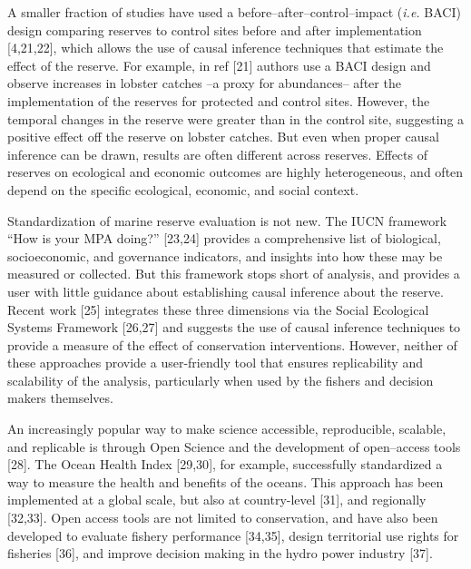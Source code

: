 \documentclass[12pt,]{article}
\begin{document}
A smaller fraction of studies have used a before--after--control--impact
(\emph{i.e.} BACI) design comparing reserves to control sites before and
after implementation {[}4,21,22{]}, which allows the use of causal
inference techniques that estimate the effect of the reserve. For
example, in ref {[}21{]} authors use a BACI design and observe increases
in lobster catches --a proxy for abundances-- after the implementation
of the reserves for protected and control sites. However, the temporal
changes in the reserve were greater than in the control site, suggesting
a positive effect off the reserve on lobster catches. But even when
proper causal inference can be drawn, results are often different across
reserves. Effects of reserves on ecological and economic outcomes are
highly heterogeneous, and often depend on the specific ecological,
economic, and social context.

Standardization of marine reserve evaluation is not new. The IUCN
framework ``How is your MPA doing?'' {[}23,24{]} provides a
comprehensive list of biological, socioeconomic, and governance
indicators, and insights into how these may be measured or collected.
But this framework stops short of analysis, and provides a user with
little guidance about establishing causal inference about the reserve.
Recent work {[}25{]} integrates these three dimensions via the Social
Ecological Systems Framework {[}26,27{]} and suggests the use of causal
inference techniques to provide a measure of the effect of conservation
interventions. However, neither of these approaches provide a
user-friendly tool that ensures replicability and scalability of the
analysis, particularly when used by the fishers and decision makers
themselves.

An increasingly popular way to make science accessible, reproducible,
scalable, and replicable is through Open Science and the development of
open--access tools {[}28{]}. The Ocean Health Index {[}29,30{]}, for
example, successfully standardized a way to measure the health and
benefits of the oceans. This approach has been implemented at a global
scale, but also at country-level {[}31{]}, and regionally {[}32,33{]}.
Open access tools are not limited to conservation, and have also been
developed to evaluate fishery performance {[}34,35{]}, design
territorial use rights for fisheries {[}36{]}, and improve decision
making in the hydro power industry {[}37{]}.
\end{document}
